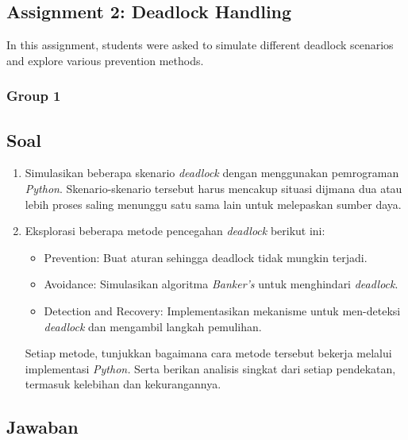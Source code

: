 \documentclass[12pt]{article}
\begin{document}
\subsection{Assignment 2: Deadlock Handling}
In this assignment, students were asked to simulate different deadlock scenarios and explore various prevention methods.

\subsubsection{Group 1}
\subsection*{Soal}

\begin{enumerate}
    \item Simulasikan beberapa skenario \textit{deadlock} dengan menggunakan pemrograman \textit{Python}. Skenario-skenario tersebut harus mencakup situasi dijmana dua atau lebih proses saling menunggu satu sama lain untuk melepaskan sumber daya.

    \item Eksplorasi beberapa metode pencegahan \textit{deadlock} berikut ini:
    \begin{itemize}
        \item  {Prevention}: Buat aturan sehingga deadlock tidak mungkin terjadi.
        \item {Avoidance}: Simulasikan algoritma \textit{Banker's} untuk menghindari \textit{deadlock}.
        \item {Detection and Recovery}: Implementasikan mekanisme untuk men-deteksi \textit{deadlock} dan mengambil langkah pemulihan.
    \end{itemize}
    Setiap metode, tunjukkan bagaimana cara metode tersebut bekerja melalui implementasi \textit{Python.} Serta berikan analisis singkat dari setiap pendekatan, termasuk kelebihan dan kekurangannya.
\end{enumerate}

\subsection*{Jawaban}
\end{document}
